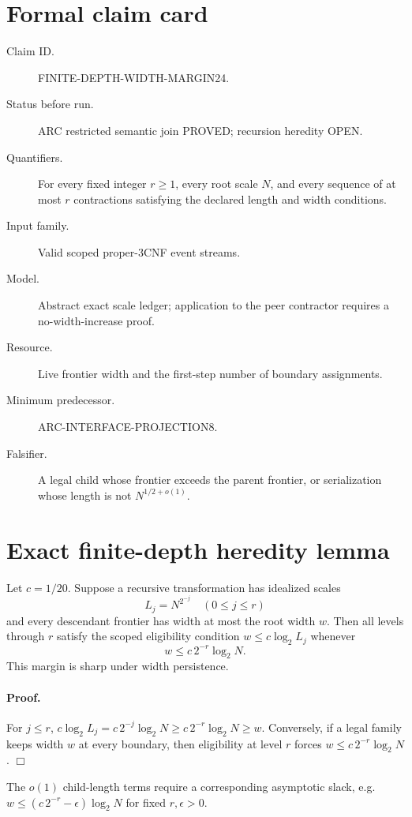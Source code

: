 \documentclass[11pt]{article}
\begin{document}
\section*{Formal claim card}
\begin{description}
\item[Claim ID.] FINITE-DEPTH-WIDTH-MARGIN24.
\item[Status before run.] ARC restricted semantic join PROVED; recursion
heredity OPEN.
\item[Quantifiers.] For every fixed integer $r\geq1$, every root scale $N$,
and every sequence of at most $r$ contractions satisfying the declared
length and width conditions.
\item[Input family.] Valid scoped proper-3CNF event streams.
\item[Model.] Abstract exact scale ledger; application to the peer contractor
requires a no-width-increase proof.
\item[Resource.] Live frontier width and the first-step number of boundary
assignments.
\item[Minimum predecessor.] ARC-INTERFACE-PROJECTION8.
\item[Falsifier.] A legal child whose frontier exceeds the parent frontier,
or serialization whose length is not $N^{1/2+o(1)}$.
\end{description}

\section*{Exact finite-depth heredity lemma}
Let $c=1/20$. Suppose a recursive transformation has idealized scales
\[
L_j=N^{2^{-j}}\quad(0\leq j\leq r)
\]
and every descendant frontier has width at most the root width $w$.
Then all levels through $r$ satisfy the scoped eligibility condition
$w\leq c\log_2 L_j$ whenever
\[
w\leq c\,2^{-r}\log_2 N.
\]
This margin is sharp under width persistence.

\paragraph{Proof.}
For $j\leq r$,
$c\log_2 L_j=c\,2^{-j}\log_2N\geq
c\,2^{-r}\log_2N\geq w$. Conversely, if a legal family keeps width
$w$ at every boundary, then eligibility at level $r$ forces
$w\leq c\,2^{-r}\log_2N$. \hfill$\Box$

The $o(1)$ child-length terms require a corresponding asymptotic slack, e.g.
$w\leq(c\,2^{-r}-\epsilon)\log_2N$ for fixed $r,\epsilon>0$.
\end{document}
